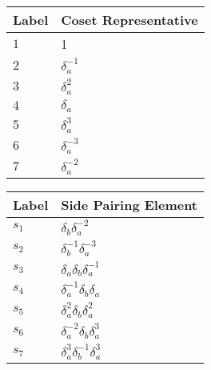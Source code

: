 \documentclass{article}
\begin{document}
\begin{center}
\begin{tabular}{ll}
\toprule
Label & Coset Representative\\
\midrule
$1$ & 1 \\
$2$ & $\delta_a^{-1}$ \\
$3$ & $\delta_a^{2}$ \\
$4$ & $\delta_a^{}$ \\
$5$ & $\delta_a^{3}$ \\
$6$ & $\delta_a^{-3}$ \\
$7$ & $\delta_a^{-2}$ \\
\bottomrule
\end{tabular}
\hfill
\begin{tabular}{ll}
\toprule
Label & Side Pairing Element\\
\midrule
$s_{1}$ & $\delta_b^{}\delta_a^{-2}$ \\
$s_{2}$ & $\delta_b^{-1}\delta_a^{-3}$ \\
$s_{3}$ & $\delta_a^{}\delta_b^{}\delta_a^{-1}$ \\
$s_{4}$ & $\delta_a^{-1}\delta_b^{}\delta_a^{}$ \\
$s_{5}$ & $\delta_a^{2}\delta_b^{}\delta_a^{2}$ \\
$s_{6}$ & $\delta_a^{-2}\delta_b^{}\delta_a^{3}$ \\
$s_{7}$ & $\delta_a^{3}\delta_b^{-1}\delta_a^{3}$ \\
\bottomrule
\end{tabular}
\end{center}

\thispagestyle{empty}
\end{document}

